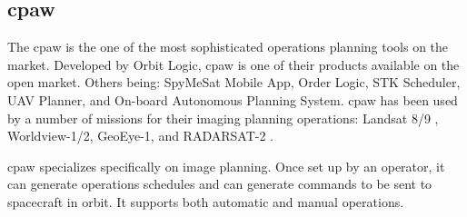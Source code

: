 \subsection{\acrshort{cpaw}}

The \gls{cpaw} is the one of the most sophisticated operations planning tools on the market. 
Developed by Orbit Logic, \gls{cpaw} is one of their products available on the open market. 
Others being: SpyMeSat Mobile App, Order Logic, STK Scheduler, UAV Planner, and On-board Autonomous Planning System.
\gls{cpaw} has been used by a number of missions for their imaging planning operations: Landsat 8/9 \cite{gokhale_mission_nodate}, Worldview-1/2, GeoEye-1, and RADARSAT-2 \cite{herz_eo_2014}.


\gls{cpaw} specializes specifically on image planning. 
Once set up by an operator, it can generate operations schedules and can generate commands to be sent to spacecraft in orbit.
It supports both automatic and manual operations.







